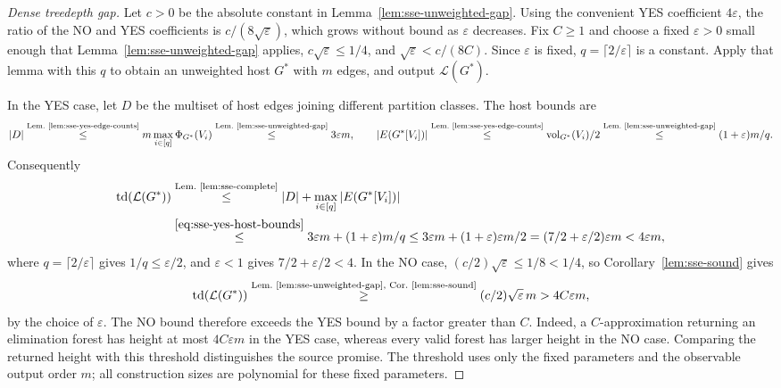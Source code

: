 \begin{proof}[Dense treedepth gap]
Let $c>0$ be the absolute constant in
Lemma~\ref{lem:sse-unweighted-gap}.
Using the convenient YES coefficient $4\varepsilon$, the ratio
of the NO and YES coefficients is $c/(8\sqrt\varepsilon)$,
which grows without bound as $\varepsilon$ decreases.
Fix $C\geq1$ and choose a fixed $\varepsilon>0$ small enough
that Lemma~\ref{lem:sse-unweighted-gap} applies,
$c\sqrt\varepsilon\leq1/4$, and $\sqrt\varepsilon<c/(8C)$.
Since $\varepsilon$ is fixed, $q=\lceil2/\varepsilon\rceil$ is a
constant. Apply that lemma with this $q$ to obtain an
unweighted host $G^*$ with $m$ edges, and output $\mathcal L(G^*)$.

In the YES case, let $D$ be the multiset of host edges joining different
partition classes. The host bounds are
\begin{equation}\label{eq:sse-yes-host-bounds}
|D|
 \overset{\text{Lem.~\ref{lem:sse-yes-edge-counts}}}{\leq}
 m\max_{i\in[q]}\Phi_{G^*}(V_i)
 \overset{\text{Lem.~\ref{lem:sse-unweighted-gap}}}{\leq}3\varepsilon m,\qquad |E(G^*[V_i])|
 \overset{\text{Lem.~\ref{lem:sse-yes-edge-counts}}}{\leq}
 \operatorname{vol}_{G^*}(V_i)/2
 \overset{\text{Lem.~\ref{lem:sse-unweighted-gap}}}{\leq}(1+\varepsilon)m/q.
\end{equation}
Consequently
\begin{equation}\label{eq:sse-yes-height}
\begin{aligned}
 \operatorname{td}(\mathcal L(G^*))
 &\overset{\text{Lem.~\ref{lem:sse-complete}}}{\leq}
 |D|+\max_{i\in[q]}|E(G^*[V_i])|\\
 &\overset{\eqref{eq:sse-yes-host-bounds}}{\leq}
 3\varepsilon m+(1+\varepsilon)m/q
 \leq3\varepsilon m+(1+\varepsilon)\varepsilon m/2
 =(7/2+\varepsilon/2)\varepsilon m<4\varepsilon m,
\end{aligned}
\end{equation}
where $q=\lceil2/\varepsilon\rceil$ gives $1/q\leq\varepsilon/2$,
and $\varepsilon<1$ gives $7/2+\varepsilon/2<4$.
In the NO case, $(c/2)\sqrt{\varepsilon}\leq1/8<1/4$, so
Corollary~\ref{lem:sse-sound} gives
\[
 \operatorname{td}(\mathcal L(G^*))
 \overset{\text{Lem.~\ref{lem:sse-unweighted-gap}, Cor.~\ref{lem:sse-sound}}}{\geq}
 (c/2)\sqrt\varepsilon\,m
 >4C\varepsilon m,
\]
by the choice of $\varepsilon$. The NO bound therefore exceeds the
YES bound by a factor greater than $C$.
Indeed, a $C$-approximation returning an elimination forest has height
at most $4C\varepsilon m$ in the YES case, whereas every valid forest
has larger height in the NO case. Comparing the returned height
with this threshold distinguishes the source promise.
The threshold uses only the fixed parameters and the observable
output order $m$; all construction sizes are polynomial for these
fixed parameters.
\end{proof}

